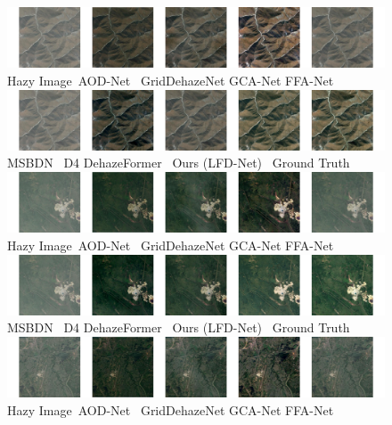 \documentclass[lettersize,journal]{IEEEtran}
\begin{document}
\begin{figure}[pht]
    \centering
    \includegraphics[width=14.5cm]{rice_0_1.jpg} \\
    Hazy Image\qquad\;\ AOD-Net\cite{li2017aod} \;\ GridDehazeNet\cite{liu2019griddehazenet} \;\; GCA-Net\cite{chen2019gated} \quad\; FFA-Net\cite{qin2020ffa}\\
    
    \includegraphics[width=14.5cm]{rice_0_2.jpg} \\ 
    MSBDN \cite{msbdn2020}\quad\quad\quad\, D4\cite{yang2022d4} \quad\quad DehazeFormer\cite{dehazeformer} \;\, Ours (LFD-Net) \quad\, Ground Truth \\
    
    \includegraphics[width=14.5cm]{rice_1_1.jpg} \\ 
    Hazy Image\qquad\;\ AOD-Net\cite{li2017aod} \;\ GridDehazeNet\cite{liu2019griddehazenet} \;\; GCA-Net\cite{chen2019gated} \quad\; FFA-Net\cite{qin2020ffa}\\
    
    \includegraphics[width=14.5cm]{rice_1_2.jpg} \\ 
    MSBDN \cite{msbdn2020}\quad\quad\quad\, D4\cite{yang2022d4} \quad\quad DehazeFormer\cite{dehazeformer} \;\, Ours (LFD-Net) \quad\, Ground Truth \\
    
    \includegraphics[width=14.5cm]{rice_2_1.jpg} \\
    Hazy Image\qquad\;\ AOD-Net\cite{li2017aod} \;\ GridDehazeNet\cite{liu2019griddehazenet} \;\; GCA-Net\cite{chen2019gated} \quad\; FFA-Net\cite{qin2020ffa}\\   
    

\end{figure}
\end{document}
